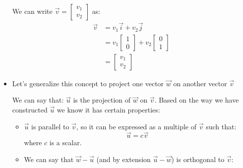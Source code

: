 \begin{itemize}
\begin{center}
    \end{center}
    We can write $\vec{v}=\begin{bmatrix}
        v_1\\v_2
    \end{bmatrix}$ as:
    \begin{align}
        \vec{v} &= v_1\vec{i}+v_2\vec{j} \\ 
        &= v_1\begin{bmatrix}
            1\\0
        \end{bmatrix} + v_2\begin{bmatrix}
            0\\ 1
        \end{bmatrix}
        \\ 
        &= \begin{bmatrix}
            v_1\\v_2
        \end{bmatrix}
    \end{align}
    \item Let's generalize this concept to project one vector $\vec{w}$ on another vector $\vec{v}$
    \begin{center}
    \end{center}
    We can say that: $\vec{u}$ is the projection of $\vec{w}$ on $\vec{v}$. Based on the way we have constructed $\vec{u}$ we know it has certain properties:
    \begin{itemize}
        \item $\vec{u}$ is parallel to $\vec{v}$, so it can be expressed as a multiple of $\vec{v}$ such that:
        \begin{equation}
            \vec{u}=c\vec{v}
            \label{eq:}
        \end{equation}
        where $c$ is a scalar.
        \item We can say that $\vec{w}-\vec{u}$ (and by extension $\vec{u}-\vec{w}$) is orthogonal to $\vec{v}$:

\end{itemize}
\end{itemize}
